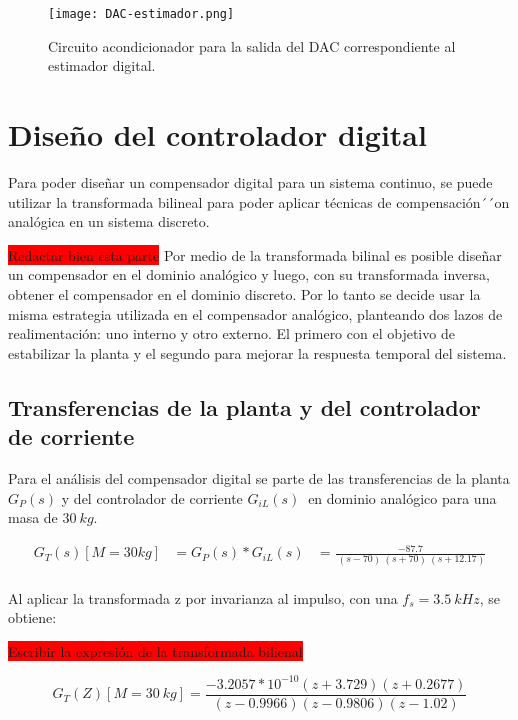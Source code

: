 \begin{figure}[H]
	\centering
	\texttt{[image: DAC-estimador.png]}
	\caption{Circuito acondicionador para la salida del DAC correspondiente al estimador digital.}
	\label{fig:DAC-estimador}
\end{figure}

\section{Diseño del controlador digital}

Para poder diseñar un compensador digital para un sistema continuo, se puede utilizar la transformada bilineal para poder aplicar técnicas de compensación´´on analógica en un sistema discreto.

 \colorbox{red}{Redactar bien esta parte}
Por medio de la transformada bilinal es posible diseñar un compensador en el dominio analógico y luego, con su transformada inversa, obtener el compensador en el dominio discreto. Por lo tanto se decide usar la misma estrategia utilizada en el compensador analógico, planteando dos lazos de realimentación: uno interno y otro externo. El primero con el objetivo de estabilizar la planta y el segundo para mejorar la respuesta temporal del sistema.  

\subsection{Transferencias de la planta y del controlador de corriente}

\noindent Para el an\'{a}lisis del compensador digital se parte de las transferencias de la planta $G_P(s)$ y del controlador de corriente $G_{iL}(s)\ $ en dominio anal\'{o}gico para una masa de $30 \:kg$.

\begin{equation} 
	\begin{aligned}
		G_T(s)[M=30kg]&=G_P(s)*G_{iL}(s)&=\frac{-87.7}{\ (s-70)\ (s+70)\ (s+12.17)}\\
	\end{aligned}
\end{equation}

\noindent Al aplicar la transformada z por invarianza al impulso, con una $f_s=3.5\:kHz$, se obtiene:

\colorbox{red}{Escribir la expresión de la transformada bilienal}

\begin{equation} 
	G_T(Z)[M=30\:kg] =\frac{-3.2057*10^{-10}(z+3.729)(z+0.2677)}{(z-0.9966)(z-0.9806) (z-1.02)}
\end{equation}


